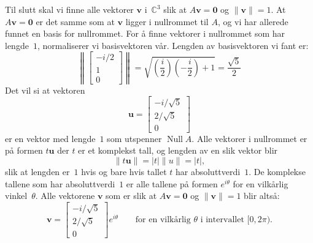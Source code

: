 \documentclass[notitlepage,a4paper,12pt,norsk]{IMFeksamen}
\newcommand{\C}{\mathbb{C}}
\DeclareMathOperator{\Null}{Null}
\newcommand{\V}[1]{\mathbf{#1}}
\newcommand{\vvv}[3]{\begin{bmatrix} #1 \\ #2 \\ #3 \end{bmatrix}}
\renewcommand{\u}{\V{u}}
\renewcommand{\v}{\V{v}}
\newcommand{\0}{\V{0}}
\newcommand{\oppgslutt}{
\begin{center}
\pgfornament[width=6cm]{88}
\end{center}
}
\newenvironment{losning}{\begin{oppgave}}{\oppgslutt\end{oppgave}}
\begin{document}
\begin{losning}
Til slutt skal vi finne alle vektorer $\v$ i~$\C^3$ slik at $A\v=\0$ og $\|\v\|=1$.
At $A\v=\0$ er det samme som at $\v$ ligger i nullrommet til $A$,
og vi har allerede funnet en basis for nullrommet.
For å finne vektorer i nullrommet som har lengde~$1$, normaliserer vi basisvektoren vår.
Lengden av basisvektoren vi fant er:
\[
\left\| \vvv{-i/2}{1}{0} \right\|
= \sqrt{ \left( \frac{i}{2} \right) \left( -\frac{i}{2} \right) + 1 }
= \frac{\sqrt{5}}{2}
\]
Det vil si at vektoren
\[
\u = \vvv{-i/\sqrt{5}}{2/\sqrt{5}}{0}
\]
er en vektor med lengde~$1$ som utspenner $\Null A$.
Alle vektorer i nullrommet er på formen $t \u$ der $t$ er et komplekst tall,
og lengden av en slik vektor blir
\[
\| t \u \| = |t| \| u \| = |t|,
\]
slik at lengden er~$1$ hvis og bare hvis tallet $t$ har absoluttverdi~$1$.
De komplekse tallene som har absoluttverdi~$1$ er alle tallene på formen
$e^{i\theta}$ for en vilkårlig vinkel~$\theta$.
Alle vektorene $\v$ som er slik at $A\v = \0$ og $\| \v \| = 1$ blir altså:
\[
\v = \vvv{-i/\sqrt{5}}{2/\sqrt{5}}{0} e^{i\theta}
\qquad
\text{for en vilkårlig $\theta$ i intervallet $[0,2\pi)$.}
\]
\end{losning}
\end{document}
